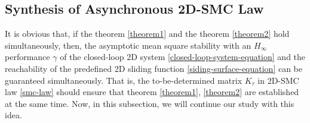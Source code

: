 \documentclass[journal,final,twocolumn]{IEEEtran}
\begin{document}
 
\subsection{  Synthesis of Asynchronous 2D-SMC Law }\label{smc-law-synthesis} 
It is obvious that, if the theorem \ref{theorem1} and the theorem \ref{theorem2} hold simultaneously, then, the asymptotic mean square stability  with an $H_{\infty}$  performance $\gamma$ of the closed-loop 2D system \eqref{closed-loop-system-equation} and the reachability of the predefined 2D sliding function \eqref{siding-surface-equation} can be guaranteed simultaneously. That is, the to-be-determined matrix $K_{\tau }$ in 2D-SMC law \eqref{smc-law} should ensure that theorem \ref{theorem1}, \ref{theorem2} are established at the same time. Now, in this subsection, we will continue our study with this idea.
\end{document}
